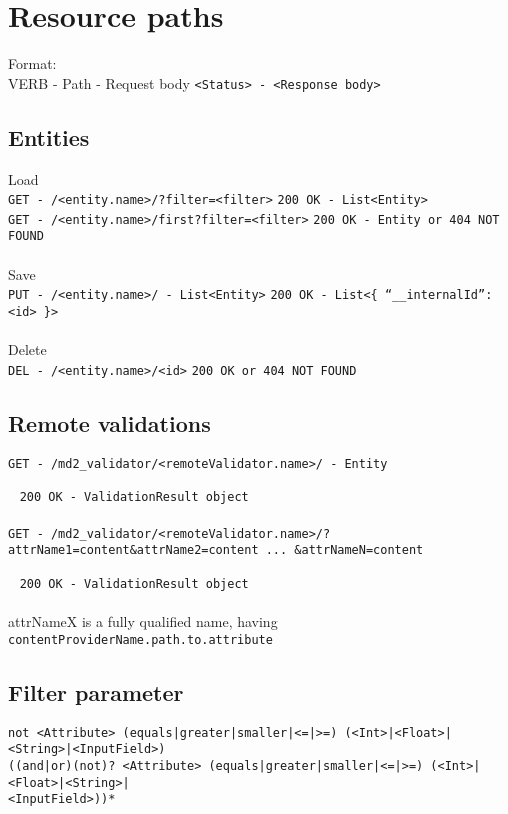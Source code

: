 
\section{Resource paths}
Format: \\
VERB - Path - Request body \hfill \lstinline|<Status> - <Response body>|

\subsection*{Entities}

Load\\
\lstinline|GET - /<entity.name>/?filter=<filter>| \hfill \lstinline|200 OK - List<Entity>| \\
\lstinline|GET - /<entity.name>/first?filter=<filter>| \hfill \lstinline|200 OK - Entity or 404 NOT FOUND|
\\
\\
Save\\
\lstinline|PUT - /<entity.name>/ - List<Entity>| \hfill \lstinline|200 OK - List<{ “__internalId”: <id> }>|
\\
\\
Delete\\
\lstinline|DEL - /<entity.name>/<id>| \hfill \lstinline|200 OK or 404 NOT FOUND|


\subsection*{Remote validations}
\lstinline|GET - /md2_validator/<remoteValidator.name>/ - Entity| 

~ \hfill \lstinline|200 OK - ValidationResult object|
\\ \\
\lstinline|GET - /md2_validator/<remoteValidator.name>/?attrName1=content&attrName2=content ... &attrNameN=content| 

~ \hfill \lstinline|200 OK - ValidationResult object|
\\
\\
attrNameX is a fully qualified name, having \\
\lstinline|contentProviderName.path.to.attribute|


\subsection*{Filter parameter}
\lstinline!not <Attribute> (equals|greater|smaller|<=|>=) (<Int>|<Float>|<String>|<InputField>) !\\
\lstinline!((and|or)(not)? <Attribute> (equals|greater|smaller|<=|>=) (<Int>|<Float>|<String>|!\\
\lstinline!<InputField>))*!

